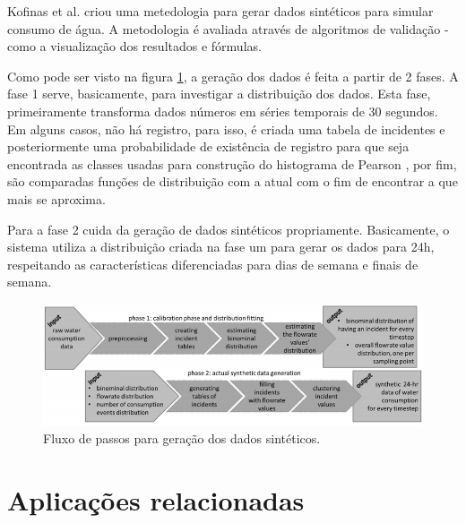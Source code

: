 \documentclass[
	12pt,				%
	openright,			%
	twoside,			%
	a4paper,			%
	english,			%
	brazil				%
	]{abntex2}
\begin{document}
			Kofinas et al. \cite{Kofinas2018} criou uma metedologia para gerar dados sintéticos para simular consumo de água. A metodologia é avaliada através de algoritmos de validação - como a visualização dos resultados e fórmulas.
			\par
			Como pode ser visto na figura \ref{fig:kofinas}, a geração dos dados é feita a partir de 2 fases. A fase 1 serve, basicamente, para investigar a distribuição dos dados. Esta fase, primeiramente transforma dados números em séries temporais de 30 segundos. Em alguns casos, não há registro, para isso, é criada uma tabela de incidentes e posteriormente uma probabilidade de existência de registro para que seja encontrada as classes usadas para construção do histograma de Pearson \cite{dean2009descriptive}, por fim, são comparadas funções de distribuição com a atual com o fim de encontrar a que mais se aproxima.
			\par
			Para a fase 2 cuida da geração de dados sintéticos propriamente. Basicamente, o sistema utiliza a distribuição criada na fase um para gerar os dados para 24h, respeitando as características diferenciadas para dias de semana e finais de semana.
			\begin{figure}[h!]
				\centering
				\includegraphics[width=\linewidth]{./figures/TrabalhosRelacionados/Kofinas21.png}
				\caption{Fluxo de passos para geração dos dados sintéticos.}
				\label{fig:kofinas}
			\end{figure}
		
		\section{Aplicações relacionadas}
\end{document}
